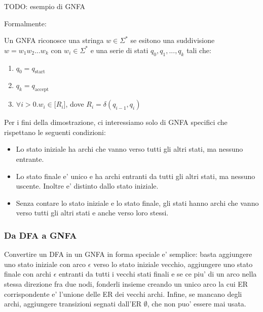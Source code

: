 TODO: esempio di GNFA

Formalmente:
 
Un GNFA riconosce una stringa $ w \in \Sigma^* $ se esitono una suddivisione $ w = w_1w_2...w_k $ con $ w_i \in \Sigma^* $ e una serie di stati $ q_0,q_1,...,q_k $ tali che:
\begin{enumerate}
  \item $ q_0 = q_{\text{start}} $
  \item $ q_k = q_{\text{accept}} $
  \item $ \forall i > 0. w_i \in \mathcal[R_i] $, dove $ R_i = \delta(q_{i-1}, q_i) $
\end{enumerate}


Per i fini della dimostrazione, ci interessiamo solo di GNFA specifici che rispettano le seguenti condizioni:
\begin{itemize}
  \item Lo stato iniziale ha archi che vanno verso tutti gli altri stati, ma nessuno entrante.
  \item Lo stato finale e' unico e ha archi entranti da tutti gli altri stati, ma nessuno uscente. Inoltre e' distinto dallo stato iniziale.
  \item Senza contare lo stato iniziale e lo stato finale, gli stati hanno archi che vanno verso tutti gli altri stati e anche verso loro stessi.
\end{itemize}

\subsubsection{Da DFA a GNFA}
Convertire un DFA in un GNFA in forma speciale e' semplice: basta aggiungere uno stato iniziale con arco $ \epsilon $ verso lo stato iniziale vecchio, aggiungere uno stato finale con archi $ \epsilon $ entranti da tutti i vecchi stati finali e se ce piu' di un arco nella stessa direzione fra due nodi, fonderli insieme creando un unico arco la cui ER corrispondente e' l'unione delle ER dei vecchi archi. Infine, se mancano degli archi, aggiungere transizioni segnati dall'ER $ \emptyset $, che non puo' essere mai usata. 

